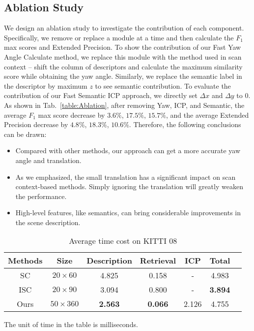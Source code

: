\documentclass[letterpaper, 10 pt, conference]{ieeeconf}  %
\begin{document}
\subsection{Ablation Study}
We design an ablation study to investigate the contribution of each component. Specifically, we remove or replace a module at a time and then calculate the \(F_1\) max scores and Extended Precision. To show the contribution of our Fast Yaw Angle Calculate method, we replace this module with the method used in scan context -- shift the column of descriptors and calculate the maximum similarity score while obtaining the yaw angle. Similarly, we replace the semantic label in the descriptor by maximum \(z\) to see semantic contribution. To evaluate the contribution of our Fast Semantic ICP approach, we directly set \(\Delta x\) and \(\Delta y\) to 0. As shown in Tab.~\ref{table:Ablation}, after removing Yaw, ICP, and Semantic, the average \(F_1\) max score decrease by \(3.6\%\), \(17.5\%\), \(15.7\%\), and the average Extended Precision decrease by \(4.8\%\), \(18.3\%\), \(10.6\%\). Therefore, the following conclusions can be drawn:
\begin{itemize}
     \item Compared with other methods, our approach can get a more accurate yaw angle and translation.
     \item As we emphasized, the small translation has a significant impact on scan context-based methods. Simply ignoring the translation will greatly weaken the performance.
     \item High-level features, like semantics, can bring considerable improvements in the scene description.
\end{itemize}

\begin{table}[t]\footnotesize
    \caption{\centering Average time cost on KITTI 08}\vspace{-3mm}
    \label{table:time}
    \begin{center}
    \begin{threeparttable}
    {
    \begin{tabular}{c c c c c c c}
    \hline
    Methods &Size& Description & Retrieval & ICP & Total\\ 
    \hline
    SC&$20\times 60$&4.825&0.158&-&4.983\\
    ISC&$20\times 90$&3.094&0.800&-&\textbf{3.894}\\
    Ours&$50\times 360$&\textbf{2.563}&\textbf{0.066}&2.126&4.755\\
    \hline
    \end{tabular}
    }
    \begin{tablenotes} 
            \footnotesize
            \item The unit of time in the table is milliseconds.
         \end{tablenotes}
    \end{threeparttable}
    \end{center}
    \end{table}
\end{document}
